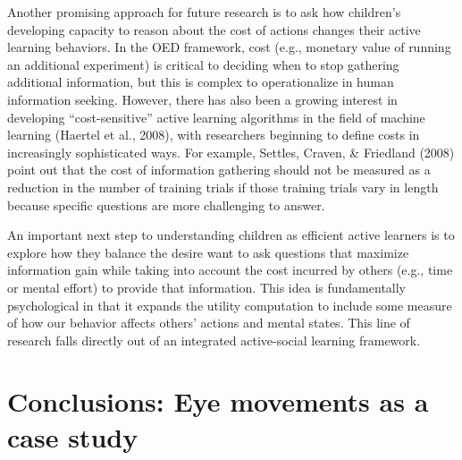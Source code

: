 \documentclass[oneside]{report}
\begin{document}
Another promising approach for future research is to ask how children's
developing capacity to reason about the cost of actions changes their
active learning behaviors. In the OED framework, cost (e.g., monetary
value of running an additional experiment) is critical to deciding when
to stop gathering additional information, but this is complex to
operationalize in human information seeking. However, there has also
been a growing interest in developing ``cost-sensitive'' active learning
algorithms in the field of machine learning (Haertel et al., 2008), with
researchers beginning to define costs in increasingly sophisticated
ways. For example, Settles, Craven, \& Friedland (2008) point out that
the cost of information gathering should not be measured as a reduction
in the number of training trials if those training trials vary in length
because specific questions are more challenging to answer.

An important next step to understanding children as efficient active
learners is to explore how they balance the desire want to ask questions
that maximize information gain while taking into account the cost
incurred by others (e.g., time or mental effort) to provide that
information. This idea is fundamentally psychological in that it expands
the utility computation to include some measure of how our behavior
affects others' actions and mental states. This line of research falls
directly out of an integrated active-social learning framework.

\section{Conclusions: Eye movements as a case
study}\label{conclusions-eye-movements-as-a-case-study}
\end{document}

